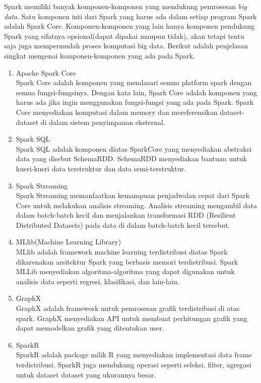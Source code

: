 \documentclass[a4paper,twoside]{article}
\begin{document}
\begin{enumerate}
		Spark memiliki banyak komponen-komponen yang mendukung pemrosesan \textit{big data}. Satu komponen inti dari Spark yang harus ada dalam setiap program Spark adalah Spark Core. Komponen-komponen yang lain hanya komponen pendukung Spark yang sifatnya opsional(dapat dipakai maupun tidak), akan tetapi tentu saja juga mempermudah proses komputasi big data. Berikut adalah penjelasan singkat mengenai komponen-komponen yang ada pada Spark.
\begin{enumerate}
\item Apache Spark Core\\
Spark Core adalah komponen yang mendasari semua platform spark dengan semua fungsi-fungsinya. Dengan kata lain, Spark Core adalah komponen yang harus ada jika ingin menggunakan fungsi-fungsi yang ada pada Spark. Spark Core menyediakan komputasi dalam memory dan mereferensikan dataset-dataset di dalam sistem penyimpanan eksternal.
\item Spark SQL \\
Spark SQL adalah komponen diatas SparkCore yang menyediakan abstraksi data yang disebut SchemaRDD. SchemaRDD menyediakan bantuan untuk kueri-kueri data terstruktur dan data semi-terstruktur.
\item Spark Streaming\\
Spark Streaming memanfaatkan kemampuan penjadwalan cepat dari Spark Core untuk melakukan analisis streaming. Analisis streaming mengambil data dalam batch-batch kecil dan menjalankan transformasi RDD (Resilient Distributed Datasets) pada data di dalam batch-batch kecil tersebut.
\item MLlib(Machine Learning Library)\\
MLlib adalah framework machine learning terdistribusi diatas Spark dikarenakan arsitektur Spark yang berbasis memori terdistribusi. Spark MLLib menyediakan algoritma-algoritma yang dapat digunakan untuk analisis data seperti regresi, klasifikasi, dan lain-lain.
\item GraphX\\
GraphX adalah framework untuk pemrosesan grafik terdistribusi di atas spark. GraphX menyediakan API untuk membuat perhitungan grafik yang dapat memodelkan grafik yang ditentukan user.
\item SparkR\\
SparkR adalah package milik R yang menyediakan implementasi data frame terdistribusi. SparkR juga mendukung operasi seperti seleksi, filter, agregasi untuk dataset dataset yang ukurannya besar.
\end{enumerate}


\end{enumerate}
\end{document}
